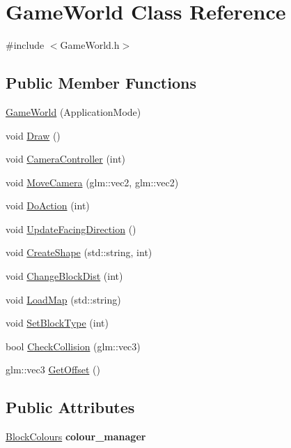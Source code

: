 \hypertarget{classGameWorld}{\section{Game\-World Class Reference}
\label{classGameWorld}
}


{\ttfamily \#include $<$Game\-World.\-h$>$}

\subsection*{Public Member Functions}
\begin{DoxyCompactItemize}
\item 
\hyperlink{classGameWorld_a17a84e57a80600961088afc753036f89}{Game\-World} (Application\-Mode)
\item 
void \hyperlink{classGameWorld_a275418607d8286979b276f165ad5876b}{Draw} ()
\item 
void \hyperlink{classGameWorld_a868f6c145f31f990974b324685f63448}{Camera\-Controller} (int)
\item 
void \hyperlink{classGameWorld_a46e48d65ed762acad6ad9ef40e6c9610}{Move\-Camera} (glm\-::vec2, glm\-::vec2)
\item 
void \hyperlink{classGameWorld_ae029ce82ab27a6bb1b2a1784ddaddaad}{Do\-Action} (int)
\item 
void \hyperlink{classGameWorld_a281a531082e7fcdfde3339445e0e4b22}{Update\-Facing\-Direction} ()
\item 
void \hyperlink{classGameWorld_ab408a83dde217403691c88f8bc498fc1}{Create\-Shape} (std\-::string, int)
\item 
void \hyperlink{classGameWorld_aaa1b24d4bba8b9a9a663b1a809552044}{Change\-Block\-Dist} (int)
\item 
void \hyperlink{classGameWorld_aaaf6174a524d23a4759b15d981304711}{Load\-Map} (std\-::string)
\item 
void \hyperlink{classGameWorld_a00e989074bc585786af91119b0996828}{Set\-Block\-Type} (int)
\item 
bool \hyperlink{classGameWorld_a800d763be7f2980d1eb7f2715616ab97}{Check\-Collision} (glm\-::vec3)
\item 
glm\-::vec3 \hyperlink{classGameWorld_a76ff889cffc8450d74e7ddedda2af7e9}{Get\-Offset} ()
\end{DoxyCompactItemize}
\subsection*{Public Attributes}
\begin{DoxyCompactItemize}
\item 
\hypertarget{classGameWorld_a08474ddb5c961a526ca3a915665459f5}{\hyperlink{classBlockColours}{Block\-Colours} {\bfseries colour\-\_\-manager}}\label{classGameWorld_a08474ddb5c961a526ca3a915665459f5}

\end{DoxyCompactItemize}


